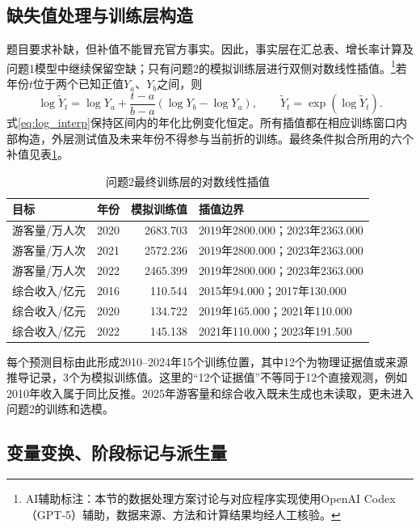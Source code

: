 \documentclass[withoutpreface,bwprint]{cumcmthesis}
\begin{document}
\subsection{缺失值处理与训练层构造}

题目要求补缺，但补值不能冒充官方事实。因此，事实层在汇总表、增长率计算及问题1模型中继续保留空缺；只有问题2的模拟训练层进行双侧对数线性插值。\footnote{AI辅助标注：本节的数据处理方案讨论与对应程序实现使用OpenAI Codex（GPT-5）辅助，数据来源、方法和计算结果均经人工核验。}若年份$t$位于两个已知正值$Y_a$、$Y_b$之间，则
\begin{equation}
\log \widetilde{Y}_t
=\log Y_a+\frac{t-a}{b-a}\left(\log Y_b-\log Y_a\right),
\qquad
\widetilde{Y}_t=\exp\!\left(\log \widetilde{Y}_t\right).
\label{eq:log_interp}
\end{equation}
式\eqref{eq:log_interp}保持区间内的年化比例变化恒定。所有插值都在相应训练窗口内部构造，外层测试值及未来年份不得参与当前折的训练。最终条件拟合所用的六个补值见表\ref{tab:training_imputation}。

\begin{table}[H]
\centering
\caption{问题2最终训练层的对数线性插值}
\label{tab:training_imputation}
\small
\renewcommand{\arraystretch}{1.10}
\begin{tabularx}{\textwidth}{p{3.0cm}c r X}
\toprule
目标 & 年份 & 模拟训练值 & 插值边界 \\
\midrule
游客量/万人次 & 2020 & 2683.703 & 2019年2800.000；2023年2363.000 \\
游客量/万人次 & 2021 & 2572.236 & 2019年2800.000；2023年2363.000 \\
游客量/万人次 & 2022 & 2465.399 & 2019年2800.000；2023年2363.000 \\
综合收入/亿元 & 2016 & 110.544 & 2015年94.000；2017年130.000 \\
综合收入/亿元 & 2020 & 134.722 & 2019年165.000；2021年110.000 \\
综合收入/亿元 & 2022 & 145.138 & 2021年110.000；2023年191.500 \\
\bottomrule
\end{tabularx}
\end{table}

每个预测目标由此形成2010--2024年15个训练位置，其中12个为物理证据值或来源推导记录，3个为模拟训练值。这里的“12个证据值”不等同于12个直接观测，例如2010年收入属于同比反推。2025年游客量和综合收入既未生成也未读取，更未进入问题2的训练和选模。

\subsection{变量变换、阶段标记与派生量}
\end{document}
